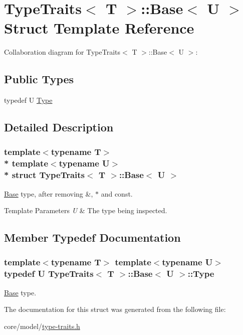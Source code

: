 \hypertarget{structTypeTraits_1_1Base}{}\section{Type\+Traits$<$ T $>$\+:\+:Base$<$ U $>$ Struct Template Reference}
\label{structTypeTraits_1_1Base}


Collaboration diagram for Type\+Traits$<$ T $>$\+:\+:Base$<$ U $>$\+:
\subsection*{Public Types}
\begin{DoxyCompactItemize}
\item 
typedef U \hyperlink{structTypeTraits_1_1Base_a37be98cc4a943dacfb020006fde5b0dc}{Type}
\end{DoxyCompactItemize}


\subsection{Detailed Description}
\subsubsection*{template$<$typename T$>$\\*
template$<$typename U$>$\\*
struct Type\+Traits$<$ T $>$\+::\+Base$<$ U $>$}

\hyperlink{structTypeTraits_1_1Base}{Base} type, after removing {\ttfamily \&}, {\ttfamily $\ast$} and {\ttfamily const}. 
\begin{DoxyTemplParams}{Template Parameters}
{\em U} & The type being inspected. \\
\hline
\end{DoxyTemplParams}


\subsection{Member Typedef Documentation}
\subsubsection[{\texorpdfstring{Type}{Type}}]{\setlength{\rightskip}{0pt plus 5cm}template$<$typename T$>$ template$<$typename U$>$ typedef U {\bf Type\+Traits}$<$ T $>$\+::{\bf Base}$<$ U $>$\+::{\bf Type}}\hypertarget{structTypeTraits_1_1Base_a37be98cc4a943dacfb020006fde5b0dc}{}\label{structTypeTraits_1_1Base_a37be98cc4a943dacfb020006fde5b0dc}
\hyperlink{structTypeTraits_1_1Base}{Base} type. 

The documentation for this struct was generated from the following file\+:\begin{DoxyCompactItemize}
\item 
core/model/\hyperlink{type-traits_8h}{type-\/traits.\+h}\end{DoxyCompactItemize}
